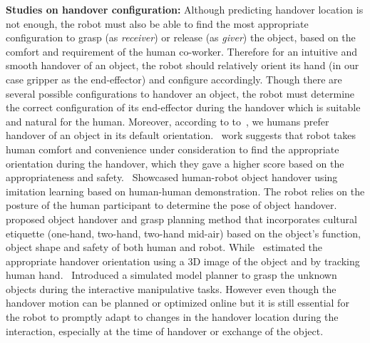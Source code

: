 \textbf{Studies on handover configuration:} Although  predicting handover location is not enough, the robot must also be able to find the most appropriate configuration to grasp (as \textit{receiver}) or release (as \textit{giver}) the object, based on the comfort and requirement of the human co-worker. Therefore for an intuitive and smooth handover of an object, the robot should relatively orient its hand (in our case gripper as the end-effector) and configure accordingly. Though there are several possible configurations to handover an object, the robot must determine the correct configuration of its end-effector during the handover which is suitable and natural for the human. Moreover, according to to~\cite{cakmak2011human}, we humans prefer handover of an object in its default orientation.~\cite{aleotti2012comfortable} work suggests that robot takes human comfort and convenience under consideration to find the appropriate orientation during the handover, which they gave a higher score based on the appropriateness and safety.~\cite{vogt2018one} Showcased human-robot object handover using imitation learning based on human-human demonstration. The robot relies on the posture of the human participant to determine the pose of object handover. ~\cite{kim2004advanced} proposed object handover and grasp planning method that incorporates cultural etiquette (one-hand, two-hand, two-hand mid-air) based on the object's function, object shape and safety of both human and robot. While~\cite{vezzani2017novel, song2013predicting, micelli2011perception} estimated the appropriate handover orientation using a 3D image of the object and by tracking human hand.~\cite{lopez2006grasp} Introduced a simulated model planner to grasp the unknown objects during the interactive manipulative tasks. However even though the handover motion can be planned or optimized online but it is still essential for the robot to promptly adapt to changes in the handover location during the interaction, especially at the time of handover or exchange of the object.

